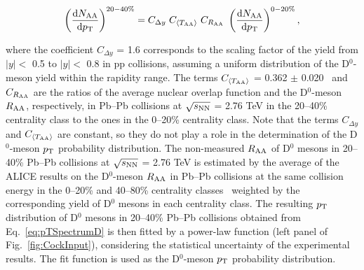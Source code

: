 \documentclass[11pt,a4paper]{article}
\providecommand{\pT}{$p_{\rm T}$ }
\providecommand{\raa}{$R_{\rm{\rm AA}}$ }
\providecommand{\snn}{$\sqrt{s_{\rm NN}}$ }
\begin{document}
\begin{equation}
\small
\left( \frac{\mathrm{d}N_{\rm AA}}{\mathrm{d}p_{\rm T}} \right)^{20-40\%}  =  C_{\Delta y} \   C_{\langle T_{\rm AA} \rangle}   \ C_{R_{\rm AA}}  
 \ \left( \frac{\mathrm{d}N_{\rm AA}}{\mathrm{d}p_{\rm T}} \right)^{0-20\%},
\label{eq:pTSpectrumD}
\end{equation} 

\noindent where the coefficient $C_{\Delta y}$ = 1.6 corresponds to the scaling factor of the yield from $|y| <$ 0.5 to $|y| <$ 0.8 in pp collisions, assuming a uniform distribution of the D$^{0}$-meson yield within the rapidity range. The terms $C_{\langle T_{\rm AA} \rangle}$ = 0.362 $ \pm$ 0.020~\cite{ALICEDRPbPb} and $C_{R_{\rm AA}}$ are the ratios of the average nuclear overlap function and the D$^{0}$-meson $R_{\rm AA}$, respectively, in Pb--Pb collisions at \snn = 2.76 TeV in  the 20--40\% centrality class to the ones in the 0--20\%  centrality class.
Note that the  terms $C_{\Delta y}$ and $C_{\langle T_{\rm AA} \rangle}$   are constant, so they do not play a role in the determination of the D$^{0}$-meson \pT probability distribution.
The non-measured \raa of D$^{0}$ mesons in 20--40\% Pb--Pb collisions at \snn = 2.76 TeV is  estimated by the average of the ALICE results on the D$^{0}$-meson $R_{\rm AA}$ in Pb--Pb collisions at the same collision energy in the 0--20\% and 40--80\% centrality classes~\cite{ALICEDRPbPb} weighted by the  corresponding yield of D$^{0}$ mesons in each centrality class.
The  resulting \pT distribution of D$^{0}$ mesons in 20--40\% Pb--Pb  collisions obtained from Eq.~\ref{eq:pTSpectrumD} is then fitted by a power-law function (left panel of Fig.~\ref{fig:CockInput}), considering  the statistical uncertainty of the experimental results. The fit function is used as the D$^{0}$-meson \pT probability distribution.
\end{document}
